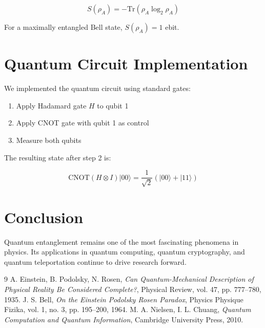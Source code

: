 \documentclass{article}
\begin{document}
$$S(\rho_A) = -\text{Tr}(\rho_A \log_2 \rho_A)$$

For a maximally entangled Bell state, $S(\rho_A) = 1$ ebit.

\section{Quantum Circuit Implementation}
We implemented the quantum circuit using standard gates:

\begin{enumerate}
\item Apply Hadamard gate $H$ to qubit 1
\item Apply CNOT gate with qubit 1 as control
\item Measure both qubits
\end{enumerate}

The resulting state after step 2 is:

$$\text{CNOT}(H \otimes I)|00\rangle = \frac{1}{\sqrt{2}}(|00\rangle + |11\rangle)$$

\section{Conclusion}
Quantum entanglement remains one of the most fascinating phenomena in physics. Its applications in quantum computing, quantum cryptography, and quantum teleportation continue to drive research forward.

\begin{thebibliography}{9}
 A. Einstein, B. Podolsky, N. Rosen, \textit{Can Quantum-Mechanical Description of Physical Reality Be Considered Complete?}, Physical Review, vol. 47, pp. 777--780, 1935.
 J. S. Bell, \textit{On the Einstein Podolsky Rosen Paradox}, Physics Physique Fizika, vol. 1, no. 3, pp. 195--200, 1964.
 M. A. Nielsen, I. L. Chuang, \textit{Quantum Computation and Quantum Information}, Cambridge University Press, 2010.
\end{thebibliography}
\end{document}
